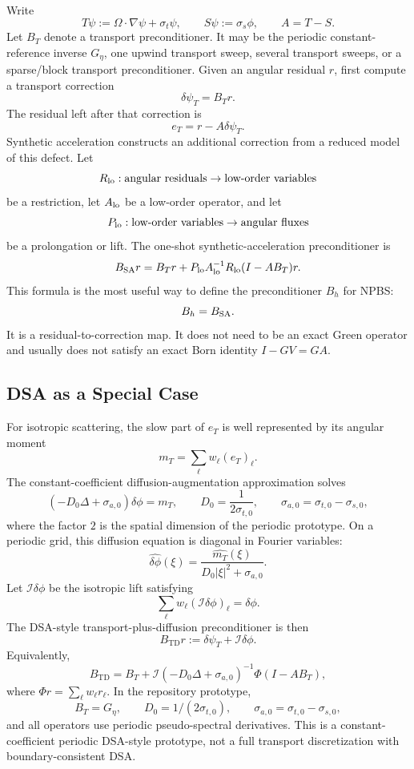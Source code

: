 \documentclass[11pt]{article}
\begin{document}
Write
\[
  T\psi := \Omega\cdot\nabla\psi+\sigma_t\psi,\qquad
  S\psi := \sigma_s\phi,\qquad
  A=T-S.
\]
Let \(B_T\) denote a transport preconditioner.  It may be the periodic
constant-reference inverse \(G_\eta\), one upwind transport sweep, several
transport sweeps, or a sparse/block transport preconditioner.  Given an angular
residual \(r\), first compute a transport correction
\[
  \delta\psi_T = B_T r.
\]
The residual left after that correction is
\[
  e_T = r-A\delta\psi_T.
\]
Synthetic acceleration constructs an additional correction from a reduced
model of this defect.  Let
\[
  R_{\rm lo}: \hbox{angular residuals}\to \hbox{low-order variables}
\]
be a restriction, let \(A_{\rm lo}\) be a low-order operator, and let
\[
  P_{\rm lo}: \hbox{low-order variables}\to \hbox{angular fluxes}
\]
be a prolongation or lift.  The one-shot synthetic-acceleration preconditioner
is
\[
  B_{\rm SA} r
  =
  B_T r
  +
  P_{\rm lo}A_{\rm lo}^{-1}R_{\rm lo}(I-AB_T)r .
\]
This formula is the most useful way to define the preconditioner \(B_h\) for
NPBS:
\[
  B_h = B_{\rm SA}.
\]
It is a residual-to-correction map.  It does not need to be an exact Green
operator and usually does not satisfy an exact Born identity
\(I-GV=GA\).

\subsection{DSA as a Special Case}

For isotropic scattering, the slow part of \(e_T\) is well represented by its
angular moment
\[
  m_T = \sum_\ell w_\ell (e_T)_\ell.
\]
The constant-coefficient diffusion-augmentation approximation solves
\[
  \left(-D_0\Delta+\sigma_{a,0}\right)\delta\phi = m_T,
  \qquad
  D_0=\frac{1}{2\sigma_{t,0}},\qquad
  \sigma_{a,0}=\sigma_{t,0}-\sigma_{s,0},
\]
where the factor \(2\) is the spatial dimension of the periodic prototype.  On
a periodic grid, this diffusion equation is diagonal in Fourier variables:
\[
  \widehat{\delta\phi}(\xi)
  =
  \frac{\widehat{m_T}(\xi)}
  {D_0|\xi|^2+\sigma_{a,0}}.
\]
Let \(\mathcal{I}\delta\phi\) be the isotropic lift satisfying
\[
  \sum_\ell w_\ell(\mathcal{I}\delta\phi)_\ell=\delta\phi .
\]
The DSA-style transport-plus-diffusion preconditioner is then
\[
  B_{\mathrm{TD}}r
  :=
  \delta\psi_T+\mathcal{I}\delta\phi .
\]
Equivalently,
\[
  B_{\mathrm{TD}}
  =
  B_T
  +
  \mathcal{I}
  \left(-D_0\Delta+\sigma_{a,0}\right)^{-1}
  \Phi(I-AB_T),
\]
where \(\Phi r=\sum_\ell w_\ell r_\ell\).  In the repository prototype,
\[
  B_T=G_\eta,\qquad
  D_0 = 1/(2\sigma_{t,0}),\qquad
  \sigma_{a,0}=\sigma_{t,0}-\sigma_{s,0},
\]
and all operators use periodic pseudo-spectral derivatives.  This is a
constant-coefficient periodic DSA-style prototype, not a full transport
discretization with boundary-consistent DSA.
\end{document}
